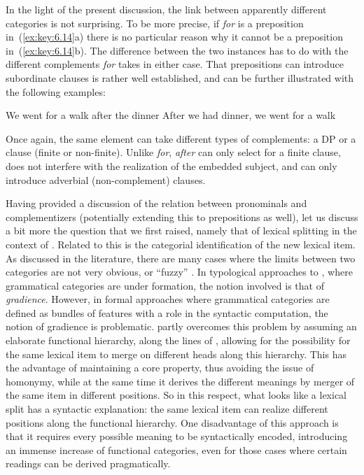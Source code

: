 \documentclass[output=paper]{langsci/langscibook}
\begin{document}
In the light of the present discussion, the link between apparently different
categories is not surprising. To be more precise, if \emph{for} is a
preposition in~(\ref{ex:key:6.14}a) there is no particular reason why it cannot
be a preposition in~(\ref{ex:key:6.14}b). The difference between the two
instances has to do with the different complements \emph{for} takes in either
case. That prepositions can introduce subordinate clauses is rather well
established, and can be further illustrated with the following examples:

\ea\label{ex:key:6.15}
	\ea We went for a walk after the dinner
	\ex After we had dinner, we went for a walk
	\z
\z

Once again, the same element can take different types of complements: a DP or a
clause (finite or non-finite). Unlike \emph{for}, \emph{after} can only select
for a finite clause, does not interfere with the realization of the embedded
subject, and can only introduce adverbial (non-complement) clauses.

Having provided a discussion of the relation between pronominals and
complementizers (potentially extending this to prepositions as well), let us
discuss a bit more the question that we first raised, namely that of lexical
splitting in the context of . Related to this is the
categorial identification of the new lexical item. As discussed in the
literature, there are many cases where the limits between two categories are
not very obvious, or \enquote{fuzzy} \parencite[see][]{TrauTrou2010}. In
typological approaches to , where grammatical
categories are under formation, the notion involved is that of
\emph{gradience}. However, in formal approaches where grammatical categories
are defined as bundles of features with a role in the syntactic computation,
the notion of gradience is problematic.  \citet{Roberts2010b} partly overcomes
this problem by assuming an elaborate functional hierarchy, along the lines of
\citet{Cinque2006}, allowing for the possibility for the same lexical item to
merge on different heads along this hierarchy. This has the advantage of
maintaining a core property, thus avoiding the issue of homonymy, while at the
same time it derives the different meanings by merger of the same item in
different positions. So in this respect, what looks like a lexical split has a
syntactic explanation: the same lexical item can realize different positions
along the functional hierarchy. One disadvantage of this approach is that it
requires every possible meaning to be syntactically encoded, introducing an
immense increase of functional categories, even for those cases where certain
readings can be derived pragmatically.
\end{document}
